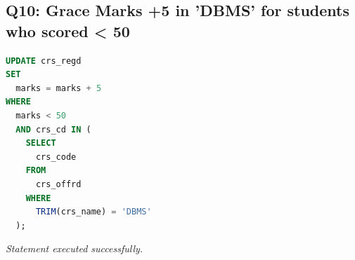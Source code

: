 \documentclass[11pt, a4paper]{article}
\begin{document}
\subsection*{Q10: Grace Marks +5 in 'DBMS' for students who scored < 50}
\begin{lstlisting}[language=SQL]
UPDATE crs_regd
SET
  marks = marks + 5
WHERE
  marks < 50
  AND crs_cd IN (
    SELECT
      crs_code
    FROM
      crs_offrd
    WHERE
      TRIM(crs_name) = 'DBMS'
  );
\end{lstlisting}
\vspace{0.3cm}
\textit{Statement executed successfully.}\vspace{0.2cm}
\newpage
\end{document}
